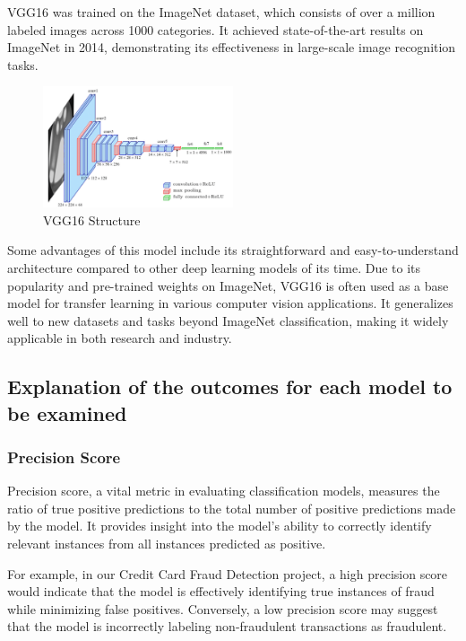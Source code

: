 \documentclass[conference]{IEEEtran}
\begin{document}
VGG16 was trained on the ImageNet dataset, which consists of over a million labeled images across 1000 categories. It achieved state-of-the-art results on ImageNet in 2014, demonstrating its effectiveness in large-scale image recognition tasks.

\begin{figure}[H]
\centering
    \includegraphics[width=0.5\textwidth]{images/VGG16Structure.png}
    \caption{VGG16 Structure}
\end{figure}


Some advantages of this model include its straightforward and easy-to-understand architecture compared to other deep learning models of its time. Due to its popularity and pre-trained weights on ImageNet, VGG16 is often used as a base model for transfer learning in various computer vision applications. It generalizes well to new datasets and tasks beyond ImageNet classification, making it widely applicable in both research and industry.

\subsection{Explanation of the outcomes for each model to be examined}

\subsubsection{Precision Score}

Precision score, a vital metric in evaluating classification models, measures the ratio of true positive predictions to the total number of positive predictions made by the model. It provides insight into the model's ability to correctly identify relevant instances from all instances predicted as positive.

For example, in our Credit Card Fraud Detection project, a high precision score would indicate that the model is effectively identifying true instances of fraud while minimizing false positives. Conversely, a low precision score may suggest that the model is incorrectly labeling non-fraudulent transactions as fraudulent.
\end{document}
